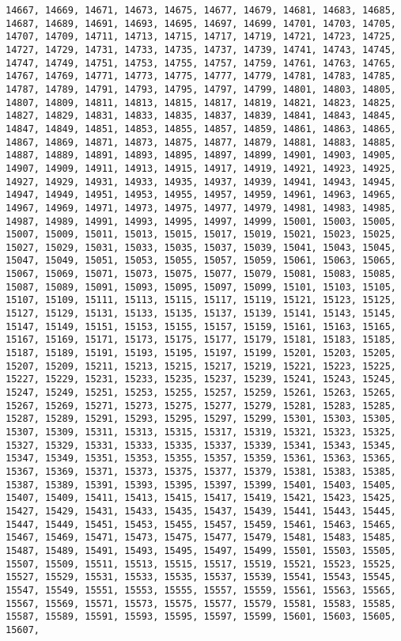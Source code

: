 \documentclass[11pt]{article}
\begin{document}
\begin{Verbatim}[commandchars=\\\{\}]
14667, 14669, 14671, 14673, 14675, 14677, 14679, 14681, 14683, 14685, 14687, 14689, 14691, 14693, 14695, 14697, 14699, 14701, 14703, 14705, 14707, 14709, 14711, 14713, 14715, 14717, 14719, 14721, 14723, 14725, 14727, 14729, 14731, 14733, 14735, 14737, 14739, 14741, 14743, 14745, 14747, 14749, 14751, 14753, 14755, 14757, 14759, 14761, 14763, 14765, 14767, 14769, 14771, 14773, 14775, 14777, 14779, 14781, 14783, 14785, 14787, 14789, 14791, 14793, 14795, 14797, 14799, 14801, 14803, 14805, 14807, 14809, 14811, 14813, 14815, 14817, 14819, 14821, 14823, 14825, 14827, 14829, 14831, 14833, 14835, 14837, 14839, 14841, 14843, 14845, 14847, 14849, 14851, 14853, 14855, 14857, 14859, 14861, 14863, 14865, 14867, 14869, 14871, 14873, 14875, 14877, 14879, 14881, 14883, 14885, 14887, 14889, 14891, 14893, 14895, 14897, 14899, 14901, 14903, 14905, 14907, 14909, 14911, 14913, 14915, 14917, 14919, 14921, 14923, 14925, 14927, 14929, 14931, 14933, 14935, 14937, 14939, 14941, 14943, 14945, 14947, 14949, 14951, 14953, 14955, 14957, 14959, 14961, 14963, 14965, 14967, 14969, 14971, 14973, 14975, 14977, 14979, 14981, 14983, 14985, 14987, 14989, 14991, 14993, 14995, 14997, 14999, 15001, 15003, 15005, 15007, 15009, 15011, 15013, 15015, 15017, 15019, 15021, 15023, 15025, 15027, 15029, 15031, 15033, 15035, 15037, 15039, 15041, 15043, 15045, 15047, 15049, 15051, 15053, 15055, 15057, 15059, 15061, 15063, 15065, 15067, 15069, 15071, 15073, 15075, 15077, 15079, 15081, 15083, 15085, 15087, 15089, 15091, 15093, 15095, 15097, 15099, 15101, 15103, 15105, 15107, 15109, 15111, 15113, 15115, 15117, 15119, 15121, 15123, 15125, 15127, 15129, 15131, 15133, 15135, 15137, 15139, 15141, 15143, 15145, 15147, 15149, 15151, 15153, 15155, 15157, 15159, 15161, 15163, 15165, 15167, 15169, 15171, 15173, 15175, 15177, 15179, 15181, 15183, 15185, 15187, 15189, 15191, 15193, 15195, 15197, 15199, 15201, 15203, 15205, 15207, 15209, 15211, 15213, 15215, 15217, 15219, 15221, 15223, 15225, 15227, 15229, 15231, 15233, 15235, 15237, 15239, 15241, 15243, 15245, 15247, 15249, 15251, 15253, 15255, 15257, 15259, 15261, 15263, 15265, 15267, 15269, 15271, 15273, 15275, 15277, 15279, 15281, 15283, 15285, 15287, 15289, 15291, 15293, 15295, 15297, 15299, 15301, 15303, 15305, 15307, 15309, 15311, 15313, 15315, 15317, 15319, 15321, 15323, 15325, 15327, 15329, 15331, 15333, 15335, 15337, 15339, 15341, 15343, 15345, 15347, 15349, 15351, 15353, 15355, 15357, 15359, 15361, 15363, 15365, 15367, 15369, 15371, 15373, 15375, 15377, 15379, 15381, 15383, 15385, 15387, 15389, 15391, 15393, 15395, 15397, 15399, 15401, 15403, 15405, 15407, 15409, 15411, 15413, 15415, 15417, 15419, 15421, 15423, 15425, 15427, 15429, 15431, 15433, 15435, 15437, 15439, 15441, 15443, 15445, 15447, 15449, 15451, 15453, 15455, 15457, 15459, 15461, 15463, 15465, 15467, 15469, 15471, 15473, 15475, 15477, 15479, 15481, 15483, 15485, 15487, 15489, 15491, 15493, 15495, 15497, 15499, 15501, 15503, 15505, 15507, 15509, 15511, 15513, 15515, 15517, 15519, 15521, 15523, 15525, 15527, 15529, 15531, 15533, 15535, 15537, 15539, 15541, 15543, 15545, 15547, 15549, 15551, 15553, 15555, 15557, 15559, 15561, 15563, 15565, 15567, 15569, 15571, 15573, 15575, 15577, 15579, 15581, 15583, 15585, 15587, 15589, 15591, 15593, 15595, 15597, 15599, 15601, 15603, 15605, 15607, 
\end{Verbatim}
\end{document}
